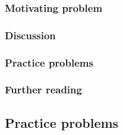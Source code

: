 \subsubsection*{Motivating problem}







\subsubsection*{Discussion}

\subsubsection*{Practice problems}

\subsubsection*{Further reading}

\subsection{Practice problems}
